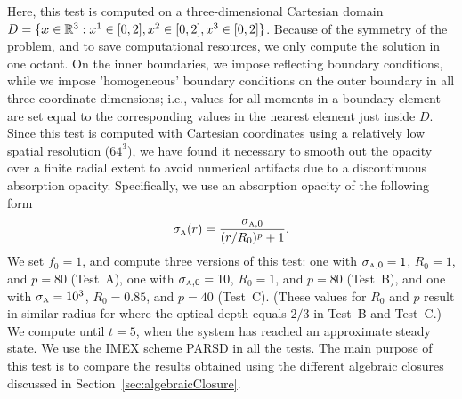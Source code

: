 Here, this test is computed on a three-dimensional Cartesian domain $D=\{\boldsymbol{x}\in\mathbb{R}^{3}:x^{1}\in[0,2], x^{2}\in[0,2], x^{3}\in[0,2]\}$.  
Because of the symmetry of the problem, and to save computational resources, we only compute the solution in one octant.  
On the inner boundaries, we impose reflecting boundary conditions, while we impose 'homogeneous' boundary conditions on the outer boundary in all three coordinate dimensions; i.e., values for all moments in a boundary element are set equal to the corresponding values in the nearest element just inside $D$.  
Since this test is computed with Cartesian coordinates using a relatively low spatial resolution ($64^{3}$), we have found it necessary to smooth out the opacity over a finite radial extent to avoid numerical artifacts due to a discontinuous absorption opacity.  
Specifically, we use an absorption opacity of the following form
\begin{equation}
  \sigma_{\mbox{\tiny A}}(r)=\frac{\sigma_{\mbox{\tiny A},0}}{(r/R_{0})^{p}+1}.  
\end{equation}
We set $f_{0}=1$, and compute three versions of this test: one with $\sigma_{\mbox{\tiny A},0}=1$, $R_{0}=1$, and $p=80$ (Test~A), one with $\sigma_{\mbox{\tiny A},0}=10$, $R_{0}=1$, and $p=80$ (Test~B), and one with $\sigma_{\mbox{\tiny A}}=10^{3}$, $R_{0}=0.85$, and $p=40$ (Test~C).  
(These values for $R_{0}$ and $p$ result in similar radius for where the optical depth equals $2/3$ in Test~B and Test~C.)
We compute until $t=5$, when the system has reached an approximate steady state.  
We use the IMEX scheme PARSD in all the tests.  
The main purpose of this test is to compare the results obtained using the different algebraic closures discussed in Section~\ref{sec:algebraicClosure}.  

